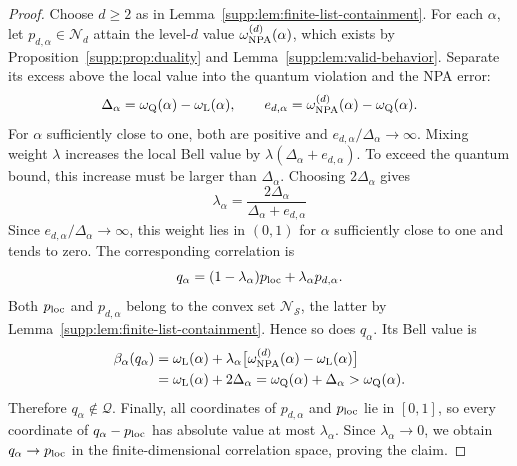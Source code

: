 \documentclass[aps,prl,onecolumn,10pt,superscriptaddress,nofootinbib,longbibliography]{revtex4-2}
\theoremstyle{remark}
\newcommand{\Q}{\mathcal Q}
\begin{document}
\begin{proof}
Choose $d\geq2$ as in Lemma~\ref{supp:lem:finite-list-containment}. For each $\alpha$, let $p_{d,\alpha}\in\mathcal N_d$ attain the level-$d$ value $\omega_{\rm NPA}^{(d)}(\alpha)$, which exists by Proposition~\ref{supp:prop:duality} and Lemma~\ref{supp:lem:valid-behavior}. Separate its excess above the local value into the quantum violation and the NPA error:
\begin{equation}
\Delta_\alpha=\omega_{\rm Q}(\alpha)-\omega_{\rm L}(\alpha),
\qquad
e_{d,\alpha}=\omega_{\rm NPA}^{(d)}(\alpha)-\omega_{\rm Q}(\alpha).
\label{supp:eq:advantage-and-excess}
\end{equation}
For $\alpha$ sufficiently close to one, both are positive and $e_{d,\alpha}/\Delta_\alpha\to\infty$. Mixing weight $\lambda$ increases the local Bell value by $\lambda(\Delta_\alpha+e_{d,\alpha})$. To exceed the quantum bound, this increase must be larger than $\Delta_\alpha$. Choosing $2\Delta_\alpha$ gives
\begin{equation}
\lambda_\alpha=\frac{2\Delta_\alpha}{\Delta_\alpha+e_{d,\alpha}}
\label{supp:eq:mixing-weight}
\end{equation}
Since $e_{d,\alpha}/\Delta_\alpha\to\infty$, this weight lies in $(0,1)$ for $\alpha$ sufficiently close to one and tends to zero. The corresponding correlation is
\begin{equation}
q_\alpha=(1-\lambda_\alpha)p_{\rm loc}+\lambda_\alpha p_{d,\alpha}.
\label{supp:eq:mixed-postquantum-behavior}
\end{equation}
Both $p_{\rm loc}$ and $p_{d,\alpha}$ belong to the convex set $\mathcal N_{\mathcal S}$, the latter by Lemma~\ref{supp:lem:finite-list-containment}. Hence so does $q_\alpha$. Its Bell value is
\begin{align}
\beta_\alpha(q_\alpha)
&=\omega_{\rm L}(\alpha)
+\lambda_\alpha\bigl[\omega_{\rm NPA}^{(d)}(\alpha)-\omega_{\rm L}(\alpha)\bigr]\nonumber\\
&=\omega_{\rm L}(\alpha)+2\Delta_\alpha
=\omega_{\rm Q}(\alpha)+\Delta_\alpha
>\omega_{\rm Q}(\alpha).
\label{supp:eq:mixed-value}
\end{align}
Therefore $q_\alpha\notin\Q$. Finally, all coordinates of $p_{d,\alpha}$ and $p_{\rm loc}$ lie in $[0,1]$, so every coordinate of $q_\alpha-p_{\rm loc}$ has absolute value at most $\lambda_\alpha$. Since $\lambda_\alpha\to0$, we obtain $q_\alpha\to p_{\rm loc}$ in the finite-dimensional correlation space, proving the claim.
\end{proof}
\end{document}
